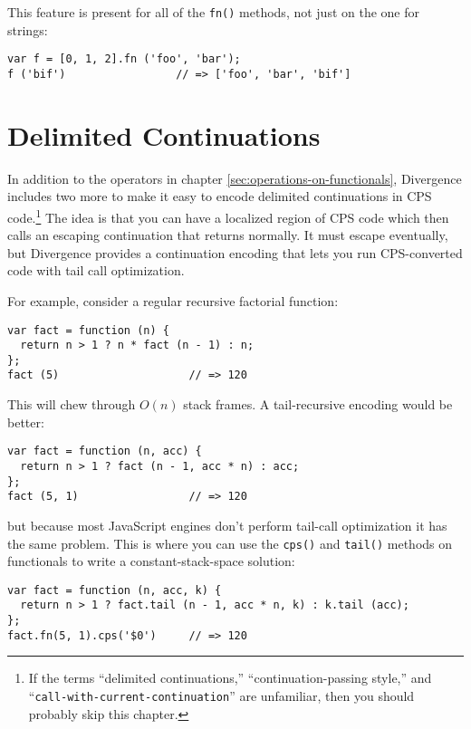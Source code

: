 \documentclass{report}
\begin{document}
      This feature is present for all of the \verb|fn()| methods, not just on the one for strings:

\begin{verbatim}
var f = [0, 1, 2].fn ('foo', 'bar');
f ('bif')                 // => ['foo', 'bar', 'bif']
\end{verbatim}

\chapter {Delimited Continuations}
    \label{sec:delimited-continuations}

    In addition to the operators in chapter \ref{sec:operations-on-functionals}, Divergence includes two more to make it easy to encode delimited continuations in CPS code.\footnote{If the
    terms ``delimited continuations,'' ``continuation-passing style,'' and ``{\tt call-with-current-continuation}'' are unfamiliar, then you should probably skip this chapter.} The idea is
    that you can have a localized region of CPS code which then calls an escaping continuation that returns normally. It must escape eventually, but Divergence provides a continuation encoding
    that lets you run CPS-converted code with tail call optimization.

    For example, consider a regular recursive factorial function:

\begin{verbatim}
var fact = function (n) {
  return n > 1 ? n * fact (n - 1) : n;
};
fact (5)                    // => 120
\end{verbatim}

    This will chew through $O(n)$ stack frames. A tail-recursive encoding would be better:

\begin{verbatim}
var fact = function (n, acc) {
  return n > 1 ? fact (n - 1, acc * n) : acc;
};
fact (5, 1)                 // => 120
\end{verbatim}

    \noindent but because most JavaScript engines don't perform tail-call optimization it has the same problem. This is where you can use the \verb|cps()| and \verb|tail()| methods on
    functionals to write a constant-stack-space solution:

\begin{verbatim}
var fact = function (n, acc, k) {
  return n > 1 ? fact.tail (n - 1, acc * n, k) : k.tail (acc);
};
fact.fn(5, 1).cps('$0')     // => 120
\end{verbatim}
\end{document}
